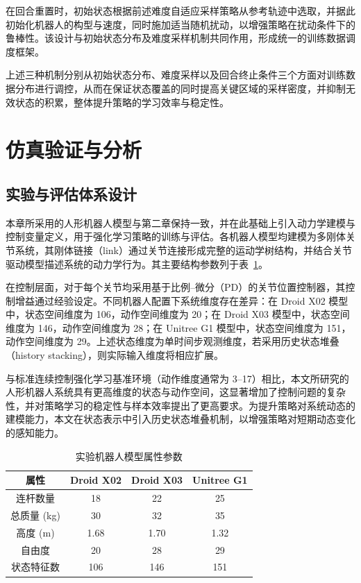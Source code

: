在回合重置时，初始状态根据前述难度自适应采样策略从参考轨迹中选取，并据此初始化机器人的构型与速度，同时施加适当随机扰动，以增强策略在扰动条件下的鲁棒性。该设计与初始状态分布及难度采样机制共同作用，形成统一的训练数据调度框架。

上述三种机制分别从初始状态分布、难度采样以及回合终止条件三个方面对训练数据分布进行调控，从而在保证状态覆盖的同时提高关键区域的采样密度，并抑制无效状态的积累，整体提升策略的学习效率与稳定性。

\section{仿真验证与分析}
\subsection{实验与评估体系设计}
本章所采用的人形机器人模型与第二章保持一致，并在此基础上引入动力学建模与控制变量定义，用于强化学习策略的训练与评估。各机器人模型均建模为多刚体关节系统，其刚体链接（link）通过关节连接形成完整的运动学树结构，并结合关节驱动模型描述系统的动力学行为。其主要结构参数列于表~\ref{tab:character_properties}。

在控制层面，对于每个关节均采用基于比例–微分（PD）的关节位置控制器，其控制增益通过经验设定。不同机器人配置下系统维度存在差异：在 Droid X02 模型中，状态空间维度为 106，动作空间维度为 20；在 Droid X03 模型中，状态空间维度为 146，动作空间维度为 28；在 Unitree G1 模型中，状态空间维度为 151，动作空间维度为 29。上述状态维度为单时间步观测维度，若采用历史状态堆叠（history stacking），则实际输入维度将相应扩展。

与标准连续控制强化学习基准环境（动作维度通常为 3--17）相比，本文所研究的人形机器人系统具有更高维度的状态与动作空间，这显著增加了控制问题的复杂性，并对策略学习的稳定性与样本效率提出了更高要求。为提升策略对系统动态的建模能力，本文在状态表示中引入历史状态堆叠机制，以增强策略对短期动态变化的感知能力。


\begin{table}[htbp]
	\centering
	\caption{实验机器人模型属性参数}
	\label{tab:character_properties}
	\begin{tabular}{cccc}
		\toprule
		属性 & Droid X02 & Droid X03 & Unitree G1 \\
		\midrule
		连杆数量 & 18 & 22 & 25 \\
		总质量 (kg) & 30 & 32 & 35 \\
		高度 (m) & 1.68 & 1.70 & 1.32 \\
		自由度 & 20 & 28 & 29 \\
		状态特征数 & 106 & 146 & 151 \\
		\bottomrule
	\end{tabular}
\end{table}

